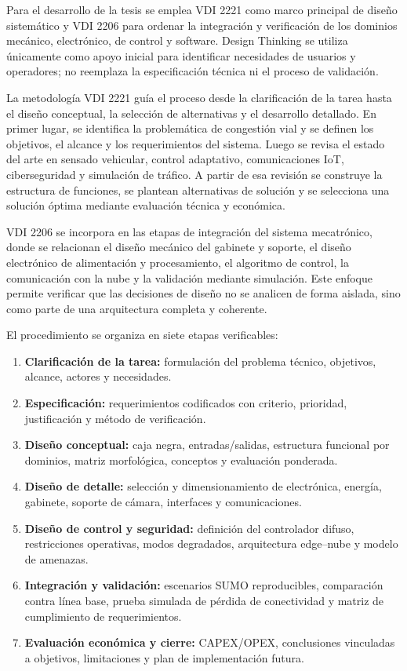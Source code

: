 \documentclass[12pt,a4paper,oneside]{report}
\begin{document}
Para el desarrollo de la tesis se emplea VDI 2221 como marco principal de diseño sistemático y VDI 2206 para ordenar la integración y verificación de los dominios mecánico, electrónico, de control y software. Design Thinking se utiliza únicamente como apoyo inicial para identificar necesidades de usuarios y operadores; no reemplaza la especificación técnica ni el proceso de validación.

La metodología VDI 2221 guía el proceso desde la clarificación de la tarea hasta el diseño conceptual, la selección de alternativas y el desarrollo detallado. En primer lugar, se identifica la problemática de congestión vial y se definen los objetivos, el alcance y los requerimientos del sistema. Luego se revisa el estado del arte en sensado vehicular, control adaptativo, comunicaciones IoT, ciberseguridad y simulación de tráfico. A partir de esa revisión se construye la estructura de funciones, se plantean alternativas de solución y se selecciona una solución óptima mediante evaluación técnica y económica.

VDI 2206 se incorpora en las etapas de integración del sistema mecatrónico, donde se relacionan el diseño mecánico del gabinete y soporte, el diseño electrónico de alimentación y procesamiento, el algoritmo de control, la comunicación con la nube y la validación mediante simulación. Este enfoque permite verificar que las decisiones de diseño no se analicen de forma aislada, sino como parte de una arquitectura completa y coherente.

El procedimiento se organiza en siete etapas verificables:
\begin{enumerate}
\item \textbf{Clarificación de la tarea:} formulación del problema técnico, objetivos, alcance, actores y necesidades.
\item \textbf{Especificación:} requerimientos codificados con criterio, prioridad, justificación y método de verificación.
\item \textbf{Diseño conceptual:} caja negra, entradas/salidas, estructura funcional por dominios, matriz morfológica, conceptos y evaluación ponderada.
\item \textbf{Diseño de detalle:} selección y dimensionamiento de electrónica, energía, gabinete, soporte de cámara, interfaces y comunicaciones.
\item \textbf{Diseño de control y seguridad:} definición del controlador difuso, restricciones operativas, modos degradados, arquitectura edge--nube y modelo de amenazas.
\item \textbf{Integración y validación:} escenarios SUMO reproducibles, comparación contra línea base, prueba simulada de pérdida de conectividad y matriz de cumplimiento de requerimientos.
\item \textbf{Evaluación económica y cierre:} CAPEX/OPEX, conclusiones vinculadas a objetivos, limitaciones y plan de implementación futura.
\end{enumerate}
\end{document}
